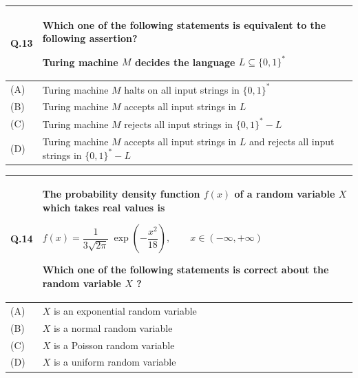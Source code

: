 \documentclass[14pt]{article}
\begin{document}
\begin{tabular}{|p{1.2cm}|p{12cm}|}
\hline

\textbf{Q.13} &
Which one of the following statements is equivalent to the following assertion?

\vspace{0.3cm}

\begin{center}
Turing machine $M$ decides the language $L \subseteq \{0,1\}^{*}$
\end{center}
\\

\hline

(A) & Turing machine $M$ halts on all input strings in $\{0,1\}^{*}$ \\
\hline

(B) & Turing machine $M$ accepts all input strings in $L$ \\
\hline

(C) & Turing machine $M$ rejects all input strings in $\{0,1\}^{*} - L$ \\
\hline

(D) & Turing machine $M$ accepts all input strings in $L$ and rejects all input strings in $\{0,1\}^{*} - L$ \\
\hline

\end{tabular}

\vspace{0.7cm}

\begin{tabular}{|p{1.2cm}|p{12cm}|}
\hline

\textbf{Q.14} &
The probability density function $f(x)$ of a random variable $X$ which takes real values is

\vspace{0.4cm}

\begin{center}

$f(x)=\dfrac{1}{3\sqrt{2\pi}}\ \exp\left(-\dfrac{x^2}{18}\right), \qquad x \in (-\infty,+\infty)$

\end{center}

\vspace{0.3cm}

Which one of the following statements is correct about the random variable $X$ ?
\\

\hline

(A) & $X$ is an exponential random variable \\
\hline

(B) & $X$ is a normal random variable \\
\hline

(C) & $X$ is a Poisson random variable \\
\hline

(D) & $X$ is a uniform random variable \\
\hline

\end{tabular}
\end{document}
